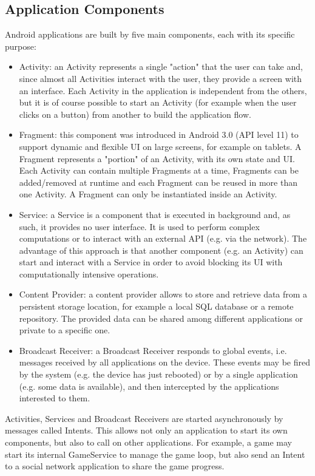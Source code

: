 \documentclass[11pt,a4paper,notitlepage]{article}
\begin{document}
\subsection{Application Components}
Android applications are built by five main components, each with its specific purpose:
\begin{itemize}
	\item Activity: an Activity represents a single "action" that the user can take and, since almost all Activities interact with the user, they provide a screen with an interface. Each Activity in the application is independent from the others, but it is of course possible to start an Activity (for example when the user clicks on a button) from another to build the application flow.
	\item Fragment: this component was introduced in Android 3.0 (API level 11) to support dynamic and flexible UI on large screens, for example on tablets. A Fragment  represents a "portion" of an Activity, with its own state and UI. Each Activity can contain multiple Fragments at a time, Fragments can be added/removed at runtime and each Fragment can be reused in more than one Activity. A Fragment can only be instantiated inside an Activity.
	\item Service: a Service is a component that is executed in background and, as such, it provides no user interface. It is used to perform complex computations or to interact with an external API (e.g. via the network). The advantage of this approach is that another component (e.g. an Activity) can start and interact with a Service in order to avoid blocking its UI with computationally intensive operations.
	\item Content Provider: a content provider allows to store and retrieve data from a persistent storage location, for example a local SQL database or a remote repository. The provided data can be shared among different applications or private to a specific one.
	\item Broadcast Receiver: a Broadcast Receiver responds to global events, i.e. messages received by all applications on the device. These events may be fired by the system (e.g. the device has just rebooted) or by a single application (e.g. some data is available), and then intercepted by the applications interested to them.
\end{itemize} 
Activities, Services and Broadcast Receivers are started asynchronously by messages called Intents. This allows not only an application to start its own components, but also to call on other applications. For example, a game may start its internal GameService to manage the game loop, but also send an Intent to a social network application to share the game progress.
\end{document}

